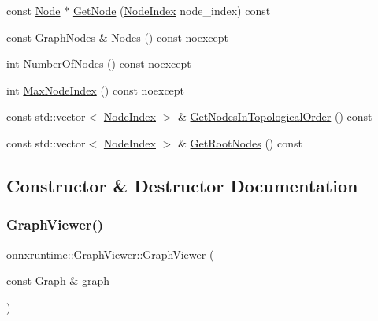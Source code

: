 \begin{DoxyCompactItemize}
\item 
const \mbox{\hyperlink{classonnxruntime_1_1Node}{Node}} $\ast$ \mbox{\hyperlink{classonnxruntime_1_1GraphViewer_a28c2a2c0c9ef24a4b62ef2de888d849b}{Get\+Node}} (\mbox{\hyperlink{namespaceonnxruntime_af8773b5c12b5d8fd9292eb2e268df760}{Node\+Index}} node\+\_\+index) const
\item 
const \mbox{\hyperlink{classonnxruntime_1_1GraphNodes}{Graph\+Nodes}} \& \mbox{\hyperlink{classonnxruntime_1_1GraphViewer_ab4f10284fb8bee8eae31bbeb8197fd63}{Nodes}} () const noexcept
\item 
int \mbox{\hyperlink{classonnxruntime_1_1GraphViewer_aecfc743ec5d8e4a5209b7a43b32c8e1d}{Number\+Of\+Nodes}} () const noexcept
\item 
int \mbox{\hyperlink{classonnxruntime_1_1GraphViewer_a4d19d0ffa0b5f8b3abe7430cbb5c3b32}{Max\+Node\+Index}} () const noexcept
\item 
const std\+::vector$<$ \mbox{\hyperlink{namespaceonnxruntime_af8773b5c12b5d8fd9292eb2e268df760}{Node\+Index}} $>$ \& \mbox{\hyperlink{classonnxruntime_1_1GraphViewer_aca9d5071746718e647bb49d7852e89c0}{Get\+Nodes\+In\+Topological\+Order}} () const
\item 
const std\+::vector$<$ \mbox{\hyperlink{namespaceonnxruntime_af8773b5c12b5d8fd9292eb2e268df760}{Node\+Index}} $>$ \& \mbox{\hyperlink{classonnxruntime_1_1GraphViewer_a9167351a5042b3e2583be502eb2b9f95}{Get\+Root\+Nodes}} () const
\end{DoxyCompactItemize}


\subsection{Constructor \& Destructor Documentation}
\mbox{\label{classonnxruntime_1_1GraphViewer_a1e00fee3a376800a386a9ff632785e60}} 
\subsubsection{\texorpdfstring{Graph\+Viewer()}{GraphViewer()}}
{\footnotesize\ttfamily onnxruntime\+::\+Graph\+Viewer\+::\+Graph\+Viewer (\begin{DoxyParamCaption}\item[{const \mbox{\hyperlink{classonnxruntime_1_1Graph}{Graph}} \&}]{graph }\end{DoxyParamCaption})}



